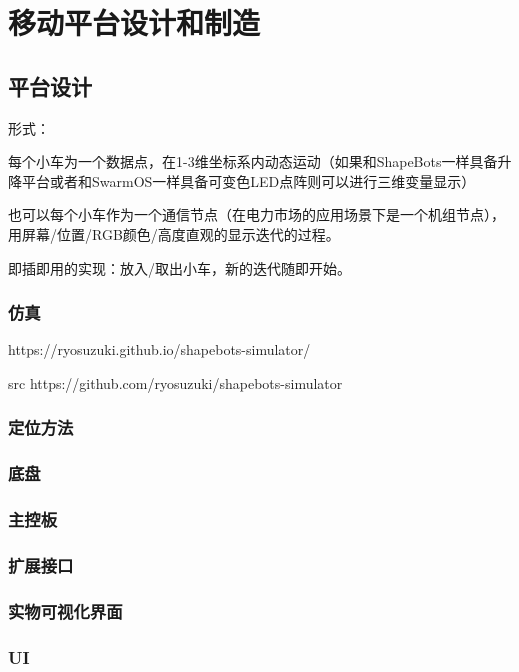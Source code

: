 \chapter{移动平台设计和制造}
\label{cha:Platform}

\section{平台设计}
形式：

每个小车为一个数据点，在1-3维坐标系内动态运动（如果和ShapeBots\cite{suzuki2019shapebots}一样具备升降平台或者和SwarmOS一样具备可变色LED点阵则可以进行三维变量显示）

也可以每个小车作为一个通信节点（在电力市场的应用场景下是一个机组节点），用屏幕/位置/RGB颜色/高度直观的显示迭代的过程。

即插即用的实现：放入/取出小车，新的迭代随即开始。

\subsection{仿真}
https://ryosuzuki.github.io/shapebots-simulator/

src https://github.com/ryosuzuki/shapebots-simulator

\subsection{定位方法}

\subsection{底盘}

\subsection{主控板}

\subsection{扩展接口}

\subsection{实物可视化界面}

\subsection{UI}